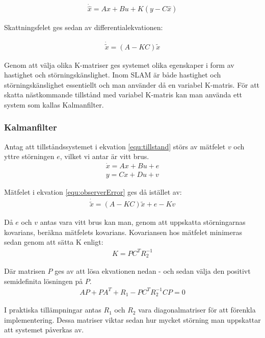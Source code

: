 \documentclass[a4paper,12pt,fleqn]{article}
\begin{document}
\begin{gather}
\dot{\hat{x}} = Ax + Bu + K(y - C\hat{x})
\label{equ:observer}
\end{gather}

Skattningsfelet ges sedan av differentialekvationen: 

\begin{gather}
\dot{\tilde{x}} = (A - KC)\tilde{x}
\label{equ:observerError}
\end{gather}

Genom att välja olika K-matriser ges systemet olika egenskaper i form av hastighet och störningskänslighet. Inom SLAM är både hastighet och störningskänslighet essentiellt och man använder då en variabel K-matris. För att skatta nästkommande tillstånd med variabel K-matris kan man använda ett system som kallas Kalmanfilter. 

\subsubsection{Kalmanfilter}

Antag att tillståndssystemet i ekvation \ref{equ:tillstand} störs av mätfelet $v$ och yttre störningen $e$, vilket vi antar är vitt brus.  
\begin{gather}
\dot{x}=Ax+Bu+e \\
y=Cx+Du+v
\end{gather}

Mätfelet i ekvation \ref{equ:observerError} ges då istället av: 
\begin{gather}
\dot{\tilde{x}} = (A - KC)\tilde{x} + e - Kv
\end{gather}

Då $e$ och $v$ antas vara vitt brus kan man, genom att uppskatta störningarnas kovarians, beräkna mätfelets kovarians. Kovariansen hos mätfelet minimeras sedan genom att sätta K enligt: 
\begin{gather}
K = PC^{T}R_{2}^{-1}
\end{gather}

Där matrisen $P$ ges av att lösa ekvationen nedan - och sedan välja den positivt semidefinita lösningen på $P$. 
\begin{gather}
AP + PA^{T} + R_{1} - PC^{T}R_{2}^{-1}CP = 0
\end{gather}

I praktiska tillämpningar antas $R_{1}$ och $R_{2}$ vara diagonalmatriser för att förenkla implementering. Dessa matriser viktar sedan hur mycket störning man uppskattar att systemet påverkas av. 
\end{document}
